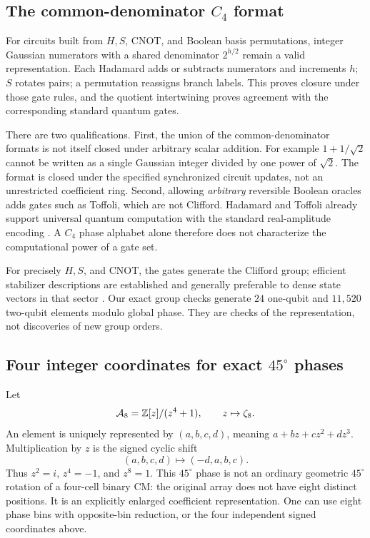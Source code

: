 \subsection{The common-denominator \texorpdfstring{$C_4$}{C4} format}
For circuits built from $H,S$, CNOT, and Boolean basis permutations, integer Gaussian numerators with a shared denominator $2^{h/2}$ remain a valid representation. Each Hadamard adds or subtracts numerators and increments $h$; $S$ rotates pairs; a permutation reassigns branch labels. This proves closure under those gate rules, and the quotient intertwining proves agreement with the corresponding standard quantum gates.

There are two qualifications. First, the union of the common-denominator formats is not itself closed under arbitrary scalar addition. For example $1+1/\sqrt2$ cannot be written as a single Gaussian integer divided by one power of $\sqrt2$. The format is closed under the specified synchronized circuit updates, not an unrestricted coefficient ring. Second, allowing \emph{arbitrary} reversible Boolean oracles adds gates such as Toffoli, which are not Clifford. Hadamard and Toffoli already support universal quantum computation with the standard real-amplitude encoding \cite{aharonov}. A $C_4$ phase alphabet alone therefore does not characterize the computational power of a gate set.

For precisely $H,S$, and CNOT, the gates generate the Clifford group; efficient stabilizer descriptions are established and generally preferable to dense state vectors in that sector \cite{aaronson}. Our exact group checks generate $24$ one-qubit and $11{,}520$ two-qubit elements modulo global phase. They are checks of the representation, not discoveries of new group orders.

\subsection{Four integer coordinates for exact \texorpdfstring{$45^\circ$}{45-degree} phases}
Let
\begin{equation}
 \mathcal A_8=\mathbb Z[z]/(z^4+1),\qquad z\mapsto\zeta_8.
\end{equation}
An element is uniquely represented by $(a,b,c,d)$, meaning $a+bz+cz^2+dz^3$. Multiplication by $z$ is the signed cyclic shift
\begin{equation}
 (a,b,c,d)\longmapsto(-d,a,b,c).
\end{equation}
Thus $z^2=i$, $z^4=-1$, and $z^8=1$. This $45^\circ$ phase is not an ordinary geometric $45^\circ$ rotation of a four-cell binary CM: the original array does not have eight distinct positions. It is an explicitly enlarged coefficient representation. One can use eight phase bins with opposite-bin reduction, or the four independent signed coordinates above.

